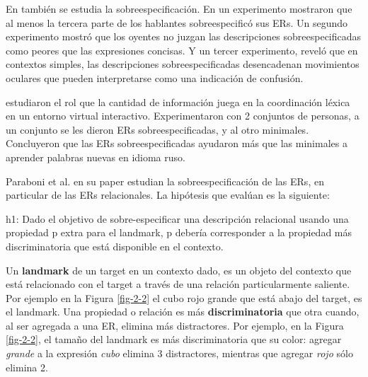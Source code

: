 En \cite{Engelhardt_Bailey_Ferreira_2006} tambi\'en se estudia la sobreespecificaci\'on. En un experimento mostraron que al menos la tercera parte de los hablantes sobreespecific\'o sus ERs. Un segundo experimento mostr\'o que los oyentes no juzgan las descripciones sobreespecificadas como peores que las expresiones concisas. Y un tercer experimento, revel\'o que en contextos simples, las descripciones sobreespecificadas desencadenan movimientos oculares que pueden interpretarse como una indicaci\'on de confusi\'on. 


\cite{Lu_sasha2015} estudiaron el rol que la cantidad de informaci\'on juega en la coordinaci\'on l\'exica en un entorno virtual interactivo. Experimentaron con 2 conjuntos de personas, a un conjunto se les dieron ERs sobreespecificadas, y al otro minimales. Concluyeron que las ERs sobreespecificadas ayudaron m\'as que las minimales a aprender palabras nuevas en idioma ruso.


Paraboni et al. en su paper \cite{acl-Paraboni15} estudian la sobreespecificaci\'on de las ERs, en particular de las ERs relacionales.
La hip\'otesis que eval\'uan es la siguiente:
\begin{it}
\begin{displayquote}h1: Dado el objetivo de sobre-especificar una descripci\'on relacional usando una propiedad p extra para el landmark, p deber\'ia corresponder a la propiedad m\'as discriminatoria que est\'a disponible en el contexto. %
\end{displayquote}
\end{it}

Un \textbf{landmark} de un target en un contexto dado, es un objeto del contexto que est\'a relacionado con el target a trav\'es de una relaci\'on particularmente saliente. Por ejemplo en la Figura \ref{fig-2-2} el cubo rojo grande que est\'a abajo del target, es el landmark.
Una propiedad o relaci\'on es m\'as \textbf{discriminatoria} que otra cuando, al ser agregada a una ER, elimina m\'as distractores. Por ejemplo, en la Figura \ref{fig-2-2}, el tama\~no del landmark es m\'as discriminatoria que su color: agregar \emph{grande} a la expresi\'on \emph{cubo} elimina 3 distractores, mientras que agregar \emph{rojo} s\'olo elimina 2.

